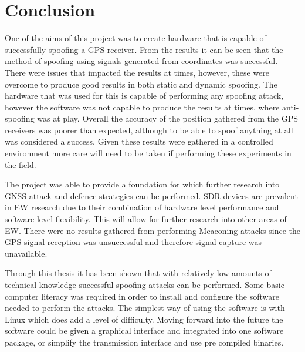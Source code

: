 
\chapter{Conclusion} %

\label{Chapter6} %


One of the aims of this project was to create hardware that is capable of successfully spoofing a GPS receiver. From the results it can be seen that the method of
spoofing using signals generated from coordinates was successful. There were issues that impacted the results at times, however, these were overcome to produce good
results in both static and dynamic spoofing. The hardware that was used for this is capable of performing any spoofing attack, however the
software was not capable to produce the results at times, where anti-spoofing was at play.
Overall the accuracy of the position gathered from the GPS receivers was poorer than expected, although
to be able to spoof anything at all was considered a success. Given these results were gathered in a controlled environment more care will need to be taken if
performing these experiments in the field. 

\bigskip

The project was able to provide a foundation for which further research into GNSS attack and defence strategies can be
performed. SDR devices are prevalent in EW research due to their combination of hardware level performance and software level flexibility. This will allow for further
research into other areas of EW.
There were no results gathered from performing Meaconing attacks since the GPS signal reception was unsuccessful and therefore signal capture was unavailable.

Through this thesis it has been shown that with relatively low amounts of technical knowledge successful spoofing attacks can be performed. Some basic computer literacy
was required in order to install and configure the software needed to perform the attacks. The simplest way of using the software is with Linux which does add a level of
difficulty.
Moving forward into the future the software could be given a graphical interface and integrated into one software package, or simplify the transmission interface and use
pre compiled binaries.

